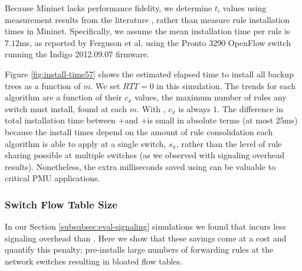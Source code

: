 Because Mininet lacks performance fidelity, we determine $t_i$ values using measurement results from the literature \cite{Ferguson13}, rather than measure rule installation times in Mininet.  
Specifically, we assume the mean installation time per rule is $7.12$ms, as reported by Ferguson et al. \cite{Ferguson13} using the Pronto 3290 OpenFlow switch running the Indigo 2012.09.07 firmware.

Figure \ref{fig:install-time57} shows the estimated elapsed time to install all backup trees as a function of $m$.  We set $RTT=0$ in this simulation.  The trends for each algorithm are a function 
of their $c_x$ values, the maximum number of rules any switch must install,  found at each $m$.  With \pres, $c_x$ is always $1$.  
The difference in total installation time between \posts+\base and \posts+\merge is small in absolute terms (at most $25$ms) because the install times depend on the amount of rule
consolidation each algorithm is able to apply at a single switch, $s_x$, rather than the level of rule sharing possible at multiple switches (as we observed with signaling overhead results).
Nonetheless, the extra milliseconds saved using \merge can be valuable to critical PMU applications.

\subsubsection{Switch Flow Table Size}
\label{subsubsec:eval-table-size}
In our Section \ref{subsubsec:eval-signaling} simulations we found that \pre incurs less signaling overhead than \posts. Here we show that these savings come at a cost and quantify this penalty;
\pre pre-installs large numbers of forwarding rules at the network switches resulting in bloated flow tables.

